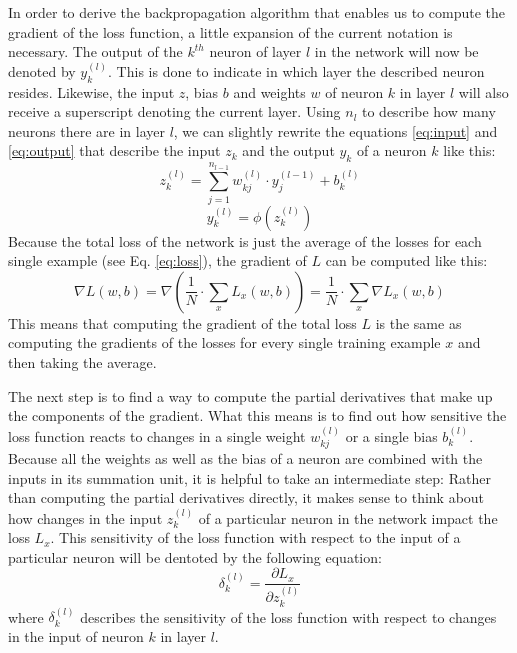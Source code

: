 In order to derive the backpropagation algorithm that enables us to
compute the gradient of the loss function, a little expansion of the
current notation is necessary. The output of the \(k^{th}\) neuron of
layer \(l\) in the network will now be denoted by \(y_k^{(l)}\). This
is done to indicate in which layer the described neuron
resides. Likewise, the input \(z\), bias \(b\) and weights \(w\) of
neuron \(k\) in layer \(l\) will also
receive a superscript denoting the current layer. Using \(n_l\) to
describe how many neurons there are in layer
\(l\), we can slightly rewrite the equations \ref{eq:input} and
\ref{eq:output} that describe the input
\(z_k\) and the output \(y_k\) of a neuron \(k\) like this:
\begin{equation}
  z_k^{(l)} = \sum_{j=1}^{n_{l-1}}{w_{kj}^{(l)} \cdot y_j^{(l-1)}} + b_k^{(l)}
\end{equation}
\begin{equation}
  y_k^{(l)} = \phi(z_k^{(l)})
\end{equation}
Because the total loss of the network is just the average of the
losses for each single example (see Eq. \ref{eq:loss}), the gradient of
\(L\) can be computed like this:
\begin{equation}
  \nabla L(w, b) = \nabla\left(\frac{1}{N} \cdot \sum_x{L_x(w, b)}
  \right) = \frac{1}{N} \cdot \sum_x{\nabla L_x(w, b)}
\end{equation}
This means that computing the gradient of the total loss \(L\) is the
same as computing the gradients of the losses for every single
training example \(x\) and then taking the average.

The next step is to find a way to compute the partial derivatives that
make up the components of the gradient. What this means is to find out
how sensitive the loss function reacts to changes in a single weight
\(w_{kj}^{(l)}\) or a single bias \(b_k^{(l)}\). Because all the
weights as well as the bias of a neuron are combined with the inputs
in its summation
unit, it is helpful to take an intermediate step: Rather than
computing the partial derivatives directly, it makes sense to think
about how changes
in the input \(z_k^{(l)}\)
of a particular neuron in the network impact the loss \(L_x\). This
sensitivity of the loss function with respect to the input of a
particular neuron will be dentoted by the following equation:
\begin{equation}
  \delta_k^{(l)} = \frac{\partial L_x}{\partial z_k^{(l)}}
\end{equation}
where \(\delta_k^{(l)}\) describes the sensitivity of the loss function
with respect to changes in the input of neuron \(k\) in layer \(l\).

